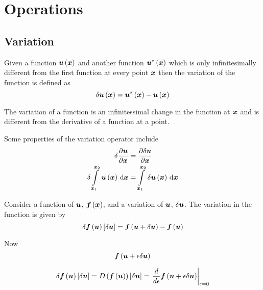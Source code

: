 \section{Operations}
\label{sec:MathsOperations}

\subsection{Variation}
\label{subsec:VariationOperator}

Given a function $  \boldsymbol{u} \left(  \boldsymbol{x}  \right) $  and another function
$  \boldsymbol{u} ^{*}\left(  \boldsymbol{x}  \right) $ which is only infinitesimally different from
the first function at every point $ \boldsymbol{x} $ then the variation of the
function is defined as
\begin{equation}
     \delta   \boldsymbol{u}  \left(  \boldsymbol{x}  \right) =  \boldsymbol{u} ^{*}\left(  \boldsymbol{x}  \right) -  \boldsymbol{u} \left(  \boldsymbol{x}  \right) 
\end{equation}

The variation of a function is an infinitessimal change in the function at
$ \boldsymbol{x} $ and is different from the derivative of a function at a point.

Some properties of the variation operator include
\begin{equation}
  \begin{split}
    \variationdir{\delby{\vectr{u}}{\vectr{x}}}&=\delby{\variationdir{\vectr{u}}}{\vectr{x}} \\
    \variationdir{\gint{\vectr{x}_{1}}{\vectr{x}_{2}}{\fnof{\vectr{u}}{\vectr{x}}}{\vectr{x}}}&=\gint{\vectr{x}_{1}}{\vectr{x}_{2}}{\variationdir{\fnof{\vectr{u}}{\vectr{x}}}}{\vectr{x}} 
  \end{split}
\end{equation}

Consider a function of $ \boldsymbol{u} $, $  \boldsymbol{f} \left(  \boldsymbol{x}  \right) $, and a
variation of $ \boldsymbol{u} $, $  \delta   \boldsymbol{u}  $. The variation in the
function is given by
\begin{equation}
     \delta    \boldsymbol{f} \left(  \boldsymbol{u}  \right) \left[   \delta   \boldsymbol{u}   \right]  =  \boldsymbol{f} \left(  \boldsymbol{u} +  \delta   \boldsymbol{u}   \right) -  \boldsymbol{f} \left(  \boldsymbol{u}  \right) 
\end{equation}

Now
\begin{equation}
    \boldsymbol{f} \left(  \boldsymbol{u} +\epsilon  \delta   \boldsymbol{u}   \right) 
\end{equation}

\begin{equation}
  \variation{\fnof{\vectr{f}}{\vectr{u}}}{\vectr{u}}=\directionalderiv{}{\fnof{\vectr{f}}{\vectr{u}}}{\variationdir{\vectr{u}}}=\evalat{\dby{}{\epsilon}\fnof{\vectr{f}}{\vectr{u}+\epsilon\variationdir{\vectr{u}}}}{\epsilon=0}
\end{equation}
  
